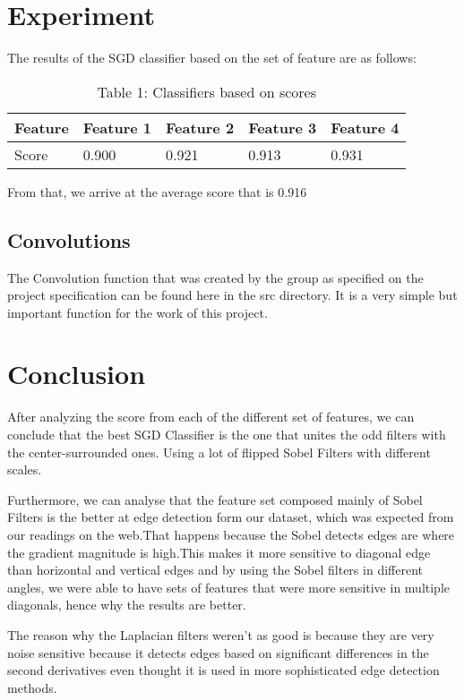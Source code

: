\documentclass[]{IEEEtran}
\begin{document}
 \section{Experiment}
    The results of the SGD classifier based on the set of feature are as follows:
    \begin{table}[h!]

    \centering
    \begin{tabu} to 1.0\linewidth { | X[l] |  X[c] | X[c] | X[c] | X[r] }
     \hline
     Feature & Feature 1 & Feature 2 & Feature 3 & Feature 4\\ [0.5ex]
     \hline
      Score & 0.900 & 0.921 & 0.913 & 0.931 \\ 
     \hline
    \end{tabu}
    \caption{Table 1: Classifiers based on scores}
  \end{table}
  From that, we arrive at the average score that is  0.916
  \subsection{Convolutions}
    The Convolution function that was created by the group as specified on the project specification can be found here
    in the src directory. It is a very simple but important function for the work of this project.
    
  
  \section{Conclusion} 
    After analyzing the score from each of the different set of features, we can conclude that the best SGD Classifier is the one that unites the odd filters with the center-surrounded ones.  Using a lot of flipped Sobel Filters with different scales.
    
    Furthermore, we can analyse that the feature set composed mainly of Sobel Filters is the better at edge detection form our dataset, which was expected from our readings on the web.That happens because the Sobel detects edges are where the gradient magnitude is high.This makes it more sensitive to diagonal edge than horizontal and vertical edges and by using the Sobel filters in different angles, we were able to have sets of features that were more sensitive in multiple diagonals, hence why the results are better.
    
    The reason why the Laplacian filters weren't as good is because they are very noise sensitive because it detects edges based on significant differences in the second derivatives even thought it is used in more sophisticated edge detection methods.
\end{document}
